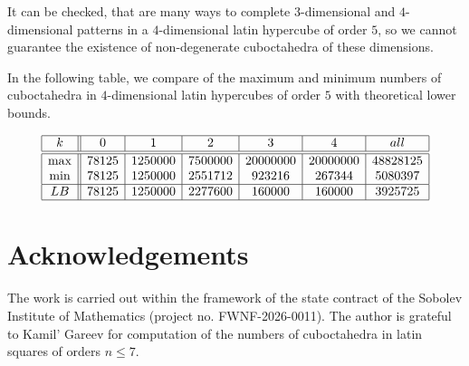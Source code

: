 \documentclass[a4paper]{article}
\begin{document}
It can be checked, that are many ways to complete  $3$-dimensional and $4$-dimensional   patterns in a $4$-dimensional latin hypercube of order $5$, so we cannot guarantee the existence of non-degenerate  cuboctahedra of these dimensions. 


In the following table, we  compare  of the maximum and minimum numbers of cuboctahedra in $4$-dimensional latin hypercubes of order $5$ with theoretical lower bounds.

$$
\begin{array}{|c||c|c|c|c|c|c|}
\hline
k & 0 & 1 & 2 & 3 & 4 & all \\
\hline
\hline
\max & 78125 & 1250000 & 7500000 & 20000000 & 20000000 & 48828125 \\
\min  & 78125 & 1250000 & 2551712 & 923216  & 267344 & 5080397 \\
\hline
LB  & 78125 & 1250000 & 2277600 & 160000  &  160000  &  3925725  \\
\hline
\end{array}
$$


\section*{Acknowledgements}

The  work is carried out within the framework of the state contract of the Sobolev Institute of Mathematics (project no. FWNF-2026-0011). The author is grateful to Kamil' Gareev for computation of the numbers of cuboctahedra in latin squares of orders $n \leq 7$. 

\begin{bibdiv}
    \begin{biblist}[\normalsize]
    \end{biblist}
    \end{bibdiv} 
\end{document}
